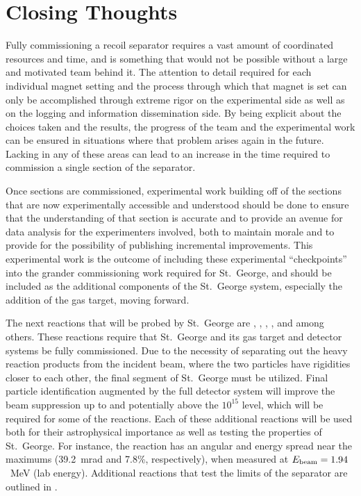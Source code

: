 \section{Closing Thoughts}
\label{sec:closing-thoughts}

Fully commissioning a recoil separator requires a vast amount of
coordinated resources and time, and is something that would not be
possible without a large and motivated team behind it. The attention to
detail required for each individual magnet setting and the process
through which that magnet is set can only be accomplished through
extreme rigor on the experimental side as well as on the logging and
information dissemination side. By being explicit about the choices
taken and the results, the progress of the team and the experimental
work can be ensured in situations where that problem arises again in the
future. Lacking in any of these areas can lead to an increase in the
time required to commission a single section of the separator.

Once sections are commissioned, experimental work building off of the
sections that are now experimentally accessible and understood should be
done to ensure that the understanding of that section is accurate and to
provide an avenue for data analysis for the experimenters involved, both
to maintain morale and to provide for the possibility of publishing
incremental improvements. This experimental work is the outcome of
including these experimental ``checkpoints'' into the grander
commissioning work required for St.\ George, and should be included as
the additional components of the St.\ George system, especially the
addition of the gas target, moving forward.

The next reactions that will be probed by St.\ George are
,
,
,
, and
 among others. These
reactions require that St.\ George and its gas target and detector
systems be fully commissioned. Due to the necessity of separating out
the heavy reaction products from the incident beam, where the two
particles have rigidities closer to each other, the final segment of
St.\ George must be utilized. Final particle identification augmented by
the full detector system will improve the beam suppression up to and
potentially above the $10^{15}$ level, which will be required for some
of the reactions. Each of these additional reactions will be used both
for their astrophysical importance as well as testing the properties of
St.\ George. For instance, the reaction
 has an angular and
energy spread near the maximums (39.2~mrad and 7.8\%, respectively),
when measured at $E_{\rm beam} = 1.94$~MeV (lab energy). Additional
reactions that test the limits of the separator are outlined in
\cite{Couder2008}.


